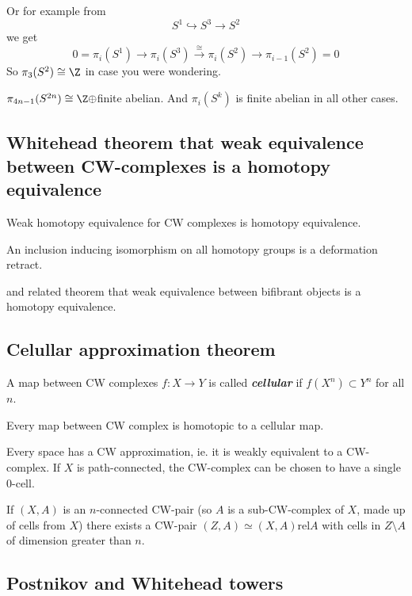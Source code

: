 \begin{remark}
Or for example from
\[S^1\hookrightarrow S^3\to S^2\]
we get
\[0=\pi_i(S^1)\to \pi_i(S^3)\overset{\cong}{\to}\pi_i(S^2)\to\pi_{i-1}(S^2)=0\]
So $\pi_3(S^2)\cong\Z$ in case you were wondering.
\begin{claim}[Serre]
	$\pi_{4n-1}(S^{2n})\cong\Z\oplus$finite abelian. And $\pi_i(S^k)$ is finite abelian in all other cases.
\end{claim}

\subsection{Whitehead theorem that weak equivalence between CW-complexes is a homotopy equivalence}

\begin{thm}[Whitehead]
	Weak homotopy equivalence for CW complexes is homotopy equivalence.

	An inclusion inducing isomorphism on all homotopy groups is a deformation retract.
\end{thm}


and related theorem that weak equivalence between bifibrant objects is a homotopy equivalence.
\subsection{Celullar approximation theorem}

\begin{definition}
	A map between CW complexes $f:X\to Y$ is called \textit{\textbf{cellular}} if $f(X^{n})\subset Y^{n}$ for all $n$.
\end{definition}
\begin{thm}
	Every map between CW complex is homotopic to a cellular map.
\end{thm}
\begin{thm}[CW approximation]
	Every space has a CW approximation, ie. it is weakly equivalent to a CW-complex.	
	If $X$ is path-connected, the CW-complex can be chosen to have a single 0-cell.

	If $(X,A)$ is an $n$-connected CW-pair (so $A$ is a sub-CW-complex of $X$, made up of cells from $X$) there exists a CW-pair $(Z,A)\simeq (X,A)\text{rel}A$ with cells in $Z\setminus A$ of dimension greater than $n$.
\end{thm}

\subsection{Postnikov and Whitehead towers}


\end{remark}
